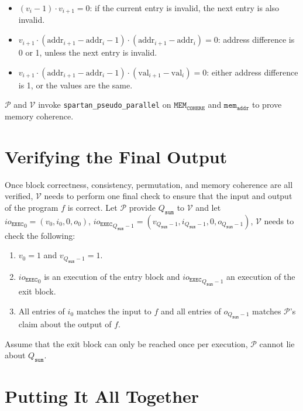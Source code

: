 \documentclass{article}
\newcommand{\code}{\texttt}
\newcommand{\Qsum}{Q_{\mathtt{sum}}}
\renewcommand{\P}{\mathcal{P}}
\newcommand{\V}{\mathcal{V}}
\newcommand{\ioe}{io_{\mathtt{EXEC}}}
\newcommand{\MEMC}{\mathtt{MEM_{COHERE}}}
\newcommand{\mema}{\mathtt{mem_{addr}}}
\newcommand{\addr}{\mbox{addr}}
\newcommand{\val}{\mbox{val}}
\begin{document}
\begin{enumerate}
    \begin{itemize}
        \item $(v_i - 1) \cdot v_{i+1} = 0$: if the current entry is invalid, the next entry is also invalid.
        \item $v_{i + 1} \cdot (\addr_{i + 1} - \addr_i - 1) \cdot (\addr_{i + 1} - \addr_i) = 0$: address difference is 0 or 1, unless the next entry is invalid.
        \item $v_{i + 1} \cdot (\addr_{i + 1} - \addr_i - 1) \cdot (\val_{i + 1} - \val_i) = 0$: either address difference is 1, or the values are the same.
    \end{itemize}
    $\P$ and $\V$ invoke \code{spartan\_pseudo\_parallel} on $\MEMC$ and $\mema$ to prove memory coherence.
\end{enumerate}


\section{Verifying the Final Output}\label{sec:final_output}

Once block correctness, consistency, permutation, and memory coherence are all verified, $\V$ needs to perform one final check to ensure that the input and output of the program $f$ is correct. Let $\P$ provide $\Qsum$ to $\V$ and let ${\ioe}_0 = (v_0, i_0, 0, o_0)$, ${\ioe}_{\Qsum - 1} = (v_{\Qsum - 1}, i_{\Qsum - 1}, 0, o_{\Qsum - 1})$, $\V$ needs to check the following:
\begin{enumerate}
    \item $v_0 = 1$ and $v_{\Qsum - 1} = 1$.
    \item ${\ioe}_0$ is an execution of the entry block and ${\ioe}_{\Qsum - 1}$ an execution of the exit block.
    \item All entries of $i_0$ matches the input to $f$ and all entries of $o_{\Qsum - 1}$ matches $\P$'s claim about the output of $f$.
\end{enumerate}
Assume that the exit block can only be reached once per execution, $\P$ cannot lie about $\Qsum$.


\section{Putting It All Together}\label{sec:summary}
\end{document}
